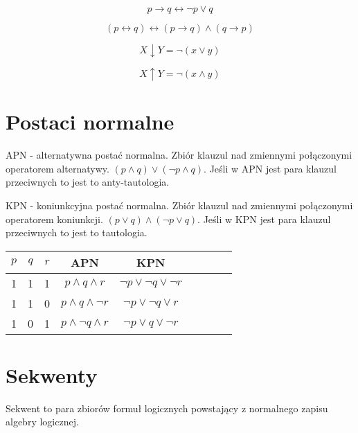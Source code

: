 \documentclass{../notatki}
\begin{document}
$$
p \rightarrow q \leftrightarrow \neg p \lor q
$$

$$
(p \leftrightarrow q) \leftrightarrow (p \rightarrow q) \land (q \rightarrow p)
$$

$$
X \downarrow Y = \neg (x \lor y)
$$

$$
X \uparrow Y = \neg (x \land y)
$$

\section{Postaci normalne}

APN - alternatywna postać normalna. Zbiór klauzul nad zmiennymi połączonymi
operatorem alternatywy. $(p \land q) \lor (\neg p \land q)$. Jeśli w APN jest
para klauzul przeciwnych to jest to anty-tautologia.

KPN - koniunkcyjna postać normalna. Zbiór klauzul nad zmiennymi połączonymi
operatorem koniunkcji. $(p \lor q) \land (\neg p \lor q)$. Jeśli w KPN jest
para klauzul przeciwnych to jest to tautologia.

\begin{tabular}{|c|c|c|c|c|c|c|l|l|}
  \hline
  $p$ & $q$ & $r$ & APN & KPN \\ \hline
  1 & 1 & 1 & $p \land q \land r$ & $\neg p \lor \neg q \lor \neg r$ \\ \hline
  1 & 1 & 0 & $p \land q \land \neg r$ & $\neg p \lor \neg q \lor r$ \\ \hline
  1 & 0 & 1 & $p \land \neg q \land r$ & $\neg p \lor q \lor \neg r$ \\ \hline
\end{tabular}

\section{Sekwenty}

Sekwent to para zbiorów formuł logicznych powstający z normalnego zapisu
algebry logicznej.

\end{document}
